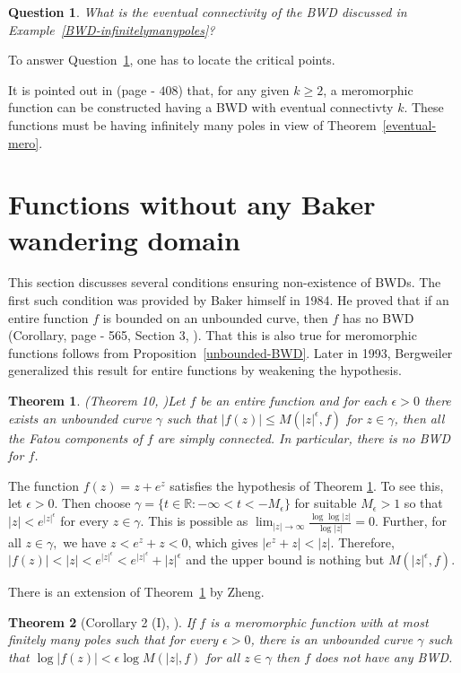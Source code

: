 \documentclass[11pt,a4paper]{article}
\newtheorem{theorem}{Theorem}[section]
\newtheorem{Question}{Question}
\begin{document}
 \begin{Question}
 What is the eventual connectivity of the BWD discussed in Example~\ref{BWD-infinitelymanypoles}? 
 \label{EC-Infinitely-many-poles}
 \end{Question}  
 To answer Question~\ref{EC-Infinitely-many-poles}, one has to locate the critical points.   
 \par 
 It is pointed out in \cite{RipponStallard 2008} (page - $408$) that, for any given  $k \geq 2$,  a meromorphic function can be constructed having a BWD with eventual connectivty $k$. These functions must be having infinitely many poles in view of Theorem~\ref{eventual-mero}.
	\section{Functions without any Baker wandering domain}
This section discusses several conditions  ensuring non-existence of BWDs. The first such condition was provided by Baker himself in 1984. He proved that if an entire function  $f$ is bounded on an unbounded curve, then $f$ has no BWD (Corollary, page - 565, Section 3, \cite{Baker 1984}). That this is also true for meromorphic functions follows from Proposition~\ref{unbounded-BWD}.
Later in 1993, Bergweiler generalized this result for entire functions by weakening the hypothesis. 
	\begin{theorem}(Theorem 10, \cite{Berg 1993})\label{Thm 4.2}
		Let $f$ be an entire function and for each $\epsilon>0$ there exists an unbounded curve $\gamma$ such that $|f(z)|\leq M(|z|^{\epsilon}, f)$ for $z\in\gamma$, then all the Fatou components of $f$ are simply connected. In particular, there is no BWD for $f$.
	\end{theorem}
 The function $f(z)=z+e^z$ satisfies the hypothesis of Theorem \ref{Thm 4.2}. To see this, let $\epsilon>0$. Then  choose $\gamma=\{t \in \mathbb{R}: -\infty < t < -M_\epsilon\}$ for suitable $M_\epsilon >1$ so that $|z|< e^{|z|^\epsilon}$ for every $z \in \gamma$. This is possible as $\lim_{|z| \to \infty} \frac{\log \log |z|}{\log |z|} =0.$ Further, for all $z \in \gamma, $ we have $z< e^z +z <0$, which gives  $|e^z +z|<|z|$. Therefore, $|f(z)|< |z|< e^{|z|^\epsilon}<e^{|z|^\epsilon} +|z|^\epsilon$ and the upper bound is nothing but $ M(|z|^{\epsilon}, f)$. 
 \par There is an extension of Theorem~\ref{Thm 4.2} by Zheng. 
 \begin{theorem}[Corollary 2 (I), \cite{Zheng 2006}]
 	If $f$ is a meromorphic function with at most finitely many poles such that for every $\epsilon>0$, there is an unbounded curve $\gamma$  such that $\log |f(z)| < \epsilon \log M(|z|,f)$ for all $z \in \gamma$ then $f$ does not have any BWD.
 	\end{theorem} 
\end{document}
